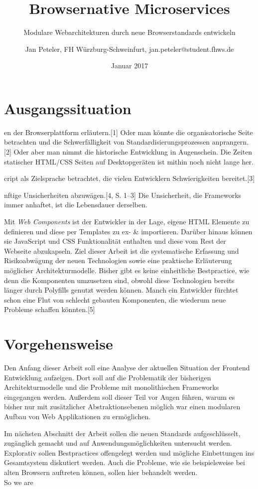 \documentclass[ngerman,]{../assets/latex/ieee}
\title{Browsernative Microservices}
\subtitle{Modulare Webarchitekturen durch neue Browserstandards entwickeln}
\author{Jan Peteler, FH Würzburg-Schweinfurt, jan.peteler@student.fhws.de}
\date{Januar 2017}
\begin{document}
\maketitle

\section{Ausgangssituation}\label{ausgangssituation}

en der Browserplattform erläutern.{[}1{]} Oder man könnte die
organisatorische Seite betrachten und die Schwerfälligkeit von
Standardisierungsprozessen anprangern.{[}2{]} Oder aber man nimmt die
historische Entwicklung in Augenschein. Die Zeiten statischer HTML/CSS
Seiten auf Desktopgeräten ist mithin noch nicht lange her.

cript als Zielsprache betrachtet, die vielen Entwicklern Schwierigkeiten
bereitet.{[}3{]}

nftige Unsicherheiten abzuwägen.{[}4, S. 1--3{]} Die Unsicherheit, die
Frameworks immer anhaftet, ist die Lebensdauer derselben.

Mit \emph{Web Components} ist der Entwickler in der Lage, eigene HTML
Elemente zu definieren und diese per Templates zu ex- \& importieren.
Darüber hinaus können sie JavaScript und CSS Funktionalität enthalten
und diese vom Rest der Webseite abzukapseln. Ziel dieser Arbeit ist die
systematische Erfassung und Risikoabwägung der neuen Technologien sowie
eine praktische Erläuterung möglicher Architekturmodelle. Bisher gibt es
keine einheitliche Bestpractice, wie denn die Komponenten umzusetzen
sind, obwohl diese Technologien bereits länger durch Polyfills genutzt
werden können. Manch ein Entwickler fürchtet schon eine Flut von
schlecht gebauten Komponenten, die wiederum neue Probleme schaffen
könnten.{[}5{]}

\section{Vorgehensweise}\label{vorgehensweise}

Den Anfang dieser Arbeit soll eine Analyse der aktuellen Situation der
Frontend Entwicklung aufzeigen. Dort soll auf die Problematik der
bisherigen Architekturmodelle und die Probleme mit monolithischen
Frameworks eingegangen werden. Außerdem soll dieser Teil vor Augen
führen, warum es bisher nur mit zusätzlicher Abstraktionsebenen möglich
war einen modularen Aufbau von Web Applikationen zu ermöglichen.

Im nächsten Abschnitt der Arbeit sollen die neuen Standards
aufgeschlüsselt, zugänglich gemacht und auf Anwendungsmöglichkeiten
untersucht werden. Explorativ sollen Bestpractices offengelegt werden
und mögliche Einbettungen ins Gesamtsystem diskutiert werden. Auch die
Probleme, wie sie beispielsweise bei alten Browsern auftreten können,
sollen hier behandelt werden.\\
So we are
\end{document}
